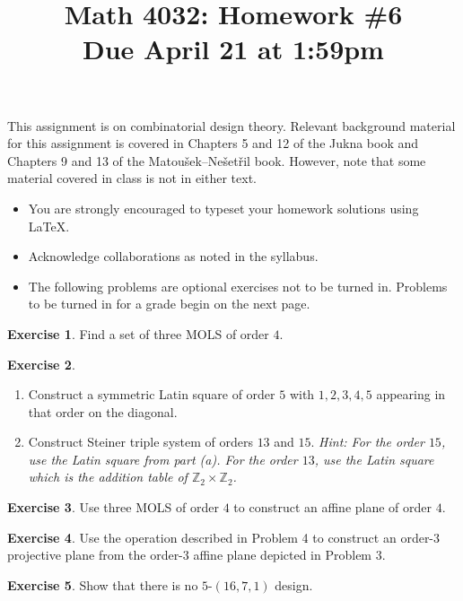 \documentclass[11pt, letter]{amsart}
\title[Math 4032: Homework \#6\qquad Due April 21 at 1:59pm]{Math 4032: Homework \#6\\
  Due April 21 at 1:59pm}
\theoremstyle{definition}
\newtheorem{exercise}{Exercise}[]
\begin{document}
\maketitle

This assignment is on combinatorial design theory.  Relevant background material for this assignment is covered in Chapters 5 and 12 of the Jukna book and Chapters 9 and 13 of the Matou\v{s}ek--Ne\v{s}et\v{r}il book.  However, note that some material covered in class is not in either text.

\begin{itemize}
\item You are strongly encouraged to typeset your homework solutions using \LaTeX.
\item Acknowledge collaborations as noted in the syllabus.
\item The following problems are optional exercises not to be turned in.  Problems to be turned in for a grade begin on the next page.  
\end{itemize}

\begin{exercise}
  Find a set of three MOLS of order $4$.
\end{exercise}

\begin{exercise}~
  \begin{enumerate}[label=(\alph*)]
  \item Construct a symmetric Latin square of order $5$ with $1, 2, 3, 4, 5$ appearing in that order on the diagonal.
  \item Construct Steiner triple system of orders $13$ and $15$. \textit{Hint: For the order $15$, use the Latin square from part (a).  For the order $13$, use the Latin square which is the addition table of $\mathbb Z_2\times \mathbb Z_2$.}
  \end{enumerate}
\end{exercise}


\begin{exercise}
  Use three MOLS of order $4$ to construct an affine plane of order $4$.
\end{exercise}

\begin{exercise}
  Use the operation described in Problem 4 to construct an order-$3$ projective plane from the order-$3$ affine plane depicted in Problem 3.
\end{exercise}

\begin{exercise}
  Show that there is no $5$-$(16, 7, 1)$ design.
\end{exercise}
\end{document}
